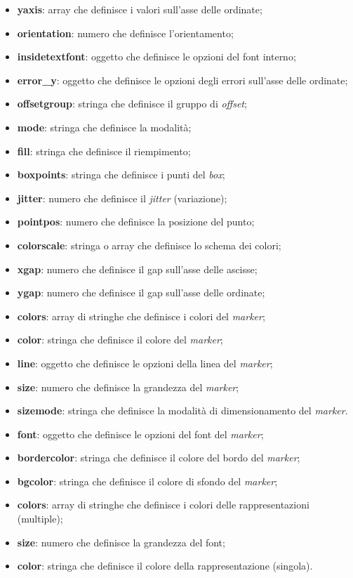 \begin{itemize}
      \item \textbf{yaxis}: array che definisce i valori sull'asse delle ordinate;
      \item \textbf{orientation}: numero che definisce l'orientamento;
      \item \textbf{insidetextfont}: oggetto che definisce le opzioni del font interno;
      \item \textbf{error\_y}: oggetto che definisce le opzioni degli errori sull'asse delle ordinate;
      \item \textbf{offsetgroup}: stringa che definisce il gruppo di \textit{offset};
      \item \textbf{mode}: stringa che definisce la modalità;
      \item \textbf{fill}: stringa che definisce il riempimento;
      \item \textbf{boxpoints}: stringa che definisce i punti del \textit{box};
      \item \textbf{jitter}: numero che definisce il \textit{jitter} (variazione);
      \item \textbf{pointpos}: numero che definisce la posizione del punto;
      \item \textbf{colorscale}: stringa o array che definisce lo schema dei colori;
      \item \textbf{xgap}: numero che definisce il gap sull'asse delle ascisse;
      \item \textbf{ygap}: numero che definisce il gap sull'asse delle ordinate;
      \item \textbf{colors}: array di stringhe che definisce i colori del \textit{marker};
      \item \textbf{color}: stringa che definisce il colore del \textit{marker};
      \item \textbf{line}: oggetto che definisce le opzioni della linea del \textit{marker};
      \item \textbf{size}: numero che definisce la grandezza del \textit{marker};
      \item \textbf{sizemode}: stringa che definisce la modalità di dimensionamento del \textit{marker}.
      \item \textbf{font}: oggetto che definisce le opzioni del font del \textit{marker};
      \item \textbf{bordercolor}: stringa che definisce il colore del bordo del \textit{marker};
      \item \textbf{bgcolor}: stringa che definisce il colore di sfondo del \textit{marker};
      \item \textbf{colors}: array di stringhe che definisce i colori delle rappresentazioni (multiple);
      \item \textbf{size}: numero che definisce la grandezza del font;
      \item \textbf{color}: stringa che definisce il colore della rappresentazione (singola).
\end{itemize}

